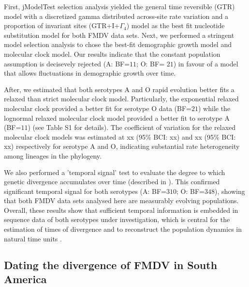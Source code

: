 \documentclass[10pt]{article}
\begin{document}

First, jModelTest selection analysis yielded the general time reversible (GTR) model with a discretized gamma distributed across-site rate variation and a proportion of invariant sites (GTR+I+$\Gamma_{4}$) model as the best fit nucleotide substitution model for both FMDV data sets. Next, we performed a stringent model selection analysis to chose the best-fit demographic growth model and molecular clock model. Our results indicate that the constant population assumption is decisevely rejected (A: BF=$11$; O: BF= $21$) in favour of a model that allows fluctuations in demographic growth over time. 

After, we estimated that both serotypes A and O rapid evolution better fits a relaxed than strict molecular clock model. Particularly, the exponential relaxed molecular clock provided a better fit for serotype O data (BF=$21$) while the lognormal relaxed molecular clock model provided a better fit to serotype A (BF=$11$) (see Table S1 for details). The coefficient of variation for the relaxed molecular clock models was estimated at xx (95\% BCI: xx) and xx (95\% BCI: xx) respectively for serotype A and O, indicating substantial rate heterogeneity among lineages in the phylogeny. 

We also performed a 'temporal signal' test to evaluate the degree to which genetic divergence accumulates over time (described in \cite{Faria2012}). This confirmed significant temporal signal for both serotypes (A: BF=$310$; O: BF=$348$), showing that both FMDV data sets analysed here are measurably evolving populations. Overall, these results show that sufficient temporal information is embedded in sequence data of both serotypes under investigation, which is central for the estimation of times of divergence and to reconstruct the population dynamics in natural time units \cite{MEP}.

\subsection*{Dating the divergence of FMDV in South America}

\end{document}
